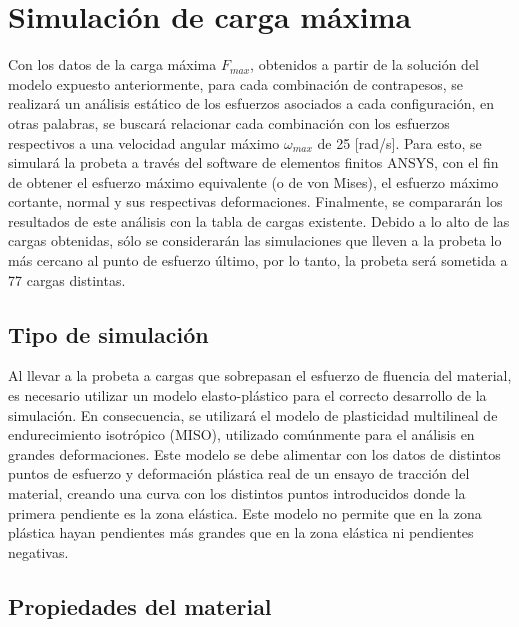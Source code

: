 \section{Simulación de carga máxima}
Con los datos de la carga máxima $F_{max}$, obtenidos a partir de la solución del modelo expuesto anteriormente, para cada combinación de contrapesos, se realizará un análisis estático de los esfuerzos asociados a cada configuración, en otras palabras, se buscará relacionar cada combinación con los esfuerzos respectivos a una velocidad angular máximo $\omega_{max}$ de 25 [rad/s]. Para esto, se simulará la probeta a través del software de elementos finitos ANSYS, con el fin de obtener el esfuerzo máximo equivalente (o de von Mises), el esfuerzo máximo cortante, normal y sus respectivas deformaciones. Finalmente, se compararán los resultados de este análisis con la tabla de cargas existente. Debido a lo alto de las cargas obtenidas, sólo se considerarán las simulaciones que lleven a la probeta lo más cercano al punto de esfuerzo último, por lo tanto, la probeta será sometida a 77 cargas distintas. 

\subsection{Tipo de simulación}
Al llevar a la probeta a cargas que sobrepasan el esfuerzo de fluencia del material, es necesario utilizar un modelo elasto-plástico para el correcto desarrollo de la simulación. En consecuencia, se utilizará el modelo de plasticidad multilineal de endurecimiento isotrópico (MISO), utilizado comúnmente para el análisis en grandes deformaciones. Este modelo se debe alimentar con los datos de distintos puntos de esfuerzo y deformación plástica real de un ensayo de tracción del material, creando una curva con los distintos puntos introducidos donde la primera pendiente es la zona elástica. Este modelo no permite que en la zona plástica hayan pendientes más grandes que en la zona elástica ni pendientes negativas. 

\subsection{Propiedades del material}
